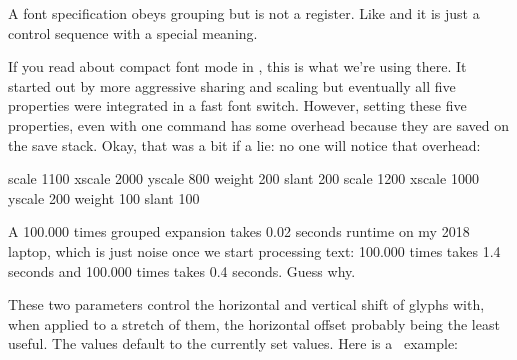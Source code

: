 A font specification obeys grouping but is not a register. Like \type
{\integerdef} and \type {\dimendef} it is just a control sequence with a special
meaning.

If you read about compact font mode in \CONTEXT, this is what we're using there.
It started out by more aggressive sharing and scaling but eventually all five
properties were integrated in a fast font switch. However, setting these five
properties, even with one command has some overhead because they are saved on the
save stack. Okay, that was a bit if a lie: no one will notice that overhead:

\startbuffer
\fontspecdef \MyFontA \font
    scale 1100 xscale 2000 yscale 800 weight 200 slant 200
\relax
\fontspecdef \MyFontB \font
    scale 1200 xscale 1000 yscale 200 weight 100 slant 100
\relax
\stopbuffer

\typebuffer [option=TEX]

A 100.000 times \type {{\MyFontA \MyFontB}} grouped expansion takes 0.02 seconds
runtime on my 2018 laptop, which is just noise once we start processing text:
100.000 times  takes 1.4 seconds
and 100.000 times  takes 0.4 seconds. Guess
why.

\stopsubsection

\startsubsection[title=Offsets]

These two parameters control the horizontal and vertical shift of glyphs with,
when applied to a stretch of them, the horizontal offset probably being the least
useful. The values default to the currently set values. Here is a \CONTEXT\ example:

